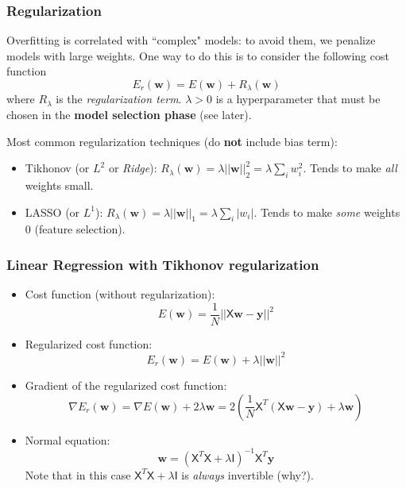 \documentclass{beamer}
\begin{document}
	
	\begin{frame}
		\frametitle{Regularization}
		
		Overfitting is correlated with ``complex" models: to avoid them, we penalize models with large weights. One way to do this is to consider the following cost function
		\begin{equation*}
			E_{r}(\bm{w}) = E(\bm{w}) + R_{\lambda}(\bm{w})
		\end{equation*}
		where $R_{\lambda}$ is the \textsl{regularization term}. $\lambda > 0$ is a hyperparameter that must be chosen in the \textbf{model selection phase} (see later).
		
		\vspace{5mm}
		
		Most common regularization techniques (do \textbf{not} include bias term):
		\begin{itemize}
			\item Tikhonov (or $L^2$ or \textit{Ridge}): $R_{\lambda}(\bm{w}) = \lambda ||\bm{w}||^2_2 = \lambda \sum_i w_i^2$. Tends to make \textit{all} weights small.
			\item LASSO (or $L^1$): $R_{\lambda}(\bm{w}) = \lambda ||\bm{w}||_1 = \lambda \sum_i |w_i|$. Tends to make \textit{some} weights $0$ (feature selection).
		\end{itemize}
	\end{frame}
	
	\begin{frame}
		\frametitle{Linear Regression with Tikhonov regularization}
		\begin{itemize}
			\item Cost function (without regularization):
			\begin{equation*}
				E(\bm{w}) = \frac{1}{N} ||\mathsf{X} \bm{w} - \bm{y}||^2
			\end{equation*}
			\item Regularized cost function:
			\begin{equation*}
				E_{r}(\bm{w}) = E(\bm{w}) + \lambda ||\bm{w}||^2
			\end{equation*}
			\item Gradient of the regularized cost function:
			\begin{equation*}
				\nabla E_r(\bm{w}) = \nabla E(\bm{w}) + 2 \lambda \bm{w} = 2\left(\frac{1}{N}\mathsf{X}^T(\mathsf{X}\bm{w} - \bm{y}) + \lambda \bm{w}\right)
			\end{equation*}
			\item Normal equation:
			\begin{equation*}
				\bm{w} = (\mathsf{X}^T\mathsf{X} + \lambda \mathsf{I})^{-1}\mathsf{X}^T\bm{y}
			\end{equation*}
			Note that in this case $\mathsf{X}^T\mathsf{X} + \lambda \mathsf{I}$ is \textsl{always} invertible (why?).
		\end{itemize}
		
		
	\end{frame}
	
\end{document}
